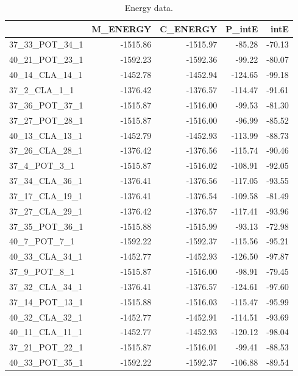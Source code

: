 \documentclass[journal=jacsat,manuscript=article]{achemso}
\begin{document}
\begin{table}[b!]
\centering
\caption{Energy data.}
\label{tab:energy_raw}
\begin{tabular}{lrrrr}
\toprule
{} &  M\_ENERGY &  C\_ENERGY &  P\_intE &    intE \\
\midrule
37\_33\_POT\_34\_1 &  -1515.86 &  -1515.97 &  -85.28 &  -70.13 \\
40\_21\_POT\_23\_1 &  -1592.23 &  -1592.36 &  -99.22 &  -80.07 \\
40\_14\_CLA\_14\_1 &  -1452.78 &  -1452.94 & -124.65 &  -99.18 \\
37\_2\_CLA\_1\_1   &  -1376.42 &  -1376.57 & -114.47 &  -91.61 \\
37\_36\_POT\_37\_1 &  -1515.87 &  -1516.00 &  -99.53 &  -81.30 \\
37\_27\_POT\_28\_1 &  -1515.87 &  -1516.00 &  -96.99 &  -85.52 \\
40\_13\_CLA\_13\_1 &  -1452.79 &  -1452.93 & -113.99 &  -88.73 \\
37\_26\_CLA\_28\_1 &  -1376.42 &  -1376.56 & -115.74 &  -90.46 \\
37\_4\_POT\_3\_1   &  -1515.87 &  -1516.02 & -108.91 &  -92.05 \\
37\_34\_CLA\_36\_1 &  -1376.41 &  -1376.56 & -117.05 &  -93.55 \\
37\_17\_CLA\_19\_1 &  -1376.41 &  -1376.54 & -109.58 &  -81.49 \\
37\_27\_CLA\_29\_1 &  -1376.42 &  -1376.57 & -117.41 &  -93.96 \\
37\_35\_POT\_36\_1 &  -1515.88 &  -1515.99 &  -93.13 &  -72.98 \\
40\_7\_POT\_7\_1   &  -1592.22 &  -1592.37 & -115.56 &  -95.21 \\
40\_33\_CLA\_34\_1 &  -1452.77 &  -1452.93 & -126.50 &  -97.87 \\
37\_9\_POT\_8\_1   &  -1515.87 &  -1516.00 &  -98.91 &  -79.45 \\
37\_32\_CLA\_34\_1 &  -1376.41 &  -1376.57 & -124.61 &  -97.60 \\
37\_14\_POT\_13\_1 &  -1515.88 &  -1516.03 & -115.47 &  -95.99 \\
40\_32\_CLA\_32\_1 &  -1452.77 &  -1452.91 & -114.51 &  -93.69 \\
40\_11\_CLA\_11\_1 &  -1452.77 &  -1452.93 & -120.12 &  -98.04 \\
37\_21\_POT\_22\_1 &  -1515.87 &  -1516.01 &  -99.41 &  -88.53 \\
40\_33\_POT\_35\_1 &  -1592.22 &  -1592.37 & -106.88 &  -89.54 \\

\end{tabular}
\end{table}
\end{document}
